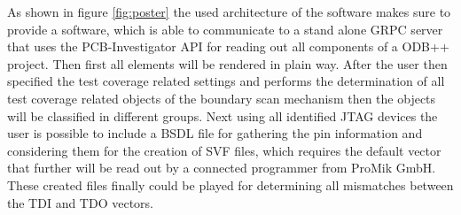 As shown in figure \ref{fig:poster} the used architecture of the software makes sure to provide a software, which is able to communicate to a stand alone \ac{GRPC} server that uses the \ac{PCB}-Investigator \ac{API} for reading out all components of a \ac{ODB}++ project. Then first all elements will be rendered in plain way. After the user then specified the test coverage related settings and performs the determination of all test coverage related objects of the boundary scan mechanism then the objects will be classified in different groups. Next using all identified \ac{JTAG} devices the user is possible to include a \ac{BSDL} file for gathering the pin information and considering them for the creation of \ac{SVF} files, which requires the default vector that further will be read out by a connected programmer from ProMik GmbH. These created files finally could be played for determining all mismatches between the TDI and TDO vectors.